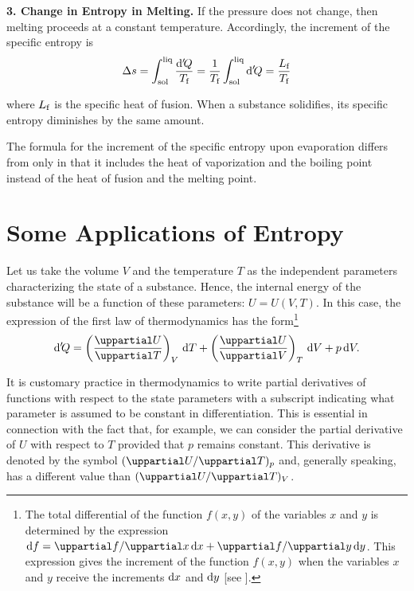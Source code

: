 \textbf{3. Change in Entropy in Melting.} If the pressure does not change, then melting proceeds at a constant temperature. Accordingly, the increment of the specific entropy is
\begin{equation}\label{eq:12_40}
	\Delta s = \int_{\text{sol}}^{\text{liq}} \frac{\mathrm{d}'\!Q}{T_{\text{f}}} = \frac{1}{T_{\text{f}}} \int_{\text{sol}}^{\text{liq}} \mathrm{d}'\!Q = \frac{L_{\text{f}}}{T_{\text{f}}}
\end{equation}

\noindent
where $L_{\text{f}}$ is the specific heat of fusion. When a substance solidifies, its specific entropy diminishes by the same amount.

The formula for the increment of the specific entropy upon evaporation differs from  only in that it includes the heat of vaporization and the boiling point instead of the heat of fusion and the melting point.

\section{Some Applications of Entropy}\label{sec:12_5}

Let us take the volume $V$ and the temperature $T$ as the independent parameters characterizing the state of a substance. Hence, the internal energy of the substance will be a function of these parameters: $U=U(V, T)$. In this case, the expression of the first law of thermodynamics has the form\footnote{The total differential of the function $f(x,y)$ of the variables $x$ and $y$ is determined by the expression $\deriv{f}=\diffinpartial{f}{x}\,\deriv{x}+\diffinpartial{f}{y}\,\deriv{y}$. This expression gives the increment of the function $f(x,y)$ when the variables $x$ and $y$ receive the increments $\mathrm{d} x$ and $\mathrm{d} y$ [see ].}
\begin{equation}\label{eq:12_41}
	\derivp{Q} = \parenthesis{\diffpartial{U}{T}}_V\,\deriv{T} + \parenthesis{\diffpartial{U}{V}}_T\,\deriv{V} + p\,\deriv{V}.
\end{equation}

\noindent
It is customary practice in thermodynamics to write partial derivatives of functions with respect to the state parameters with a subscript indicating what parameter is assumed to be constant in differentiation. This is essential in connection with the fact that, for example, we can consider the partial derivative of $U$ with respect to $T$ provided that $p$ remains constant. This derivative is denoted by the symbol $(\diffinpartial{U}{T})_p$ and, generally speaking, has a different value than $(\diffinpartial{U}{T})_V$.

